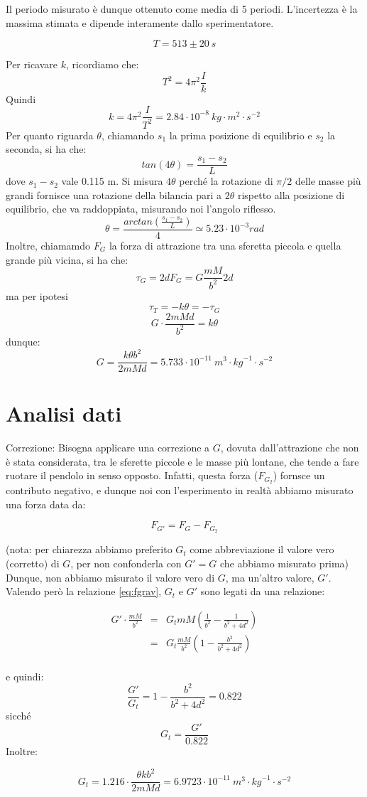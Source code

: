 Il periodo misurato è dunque ottenuto come media di 5 periodi. L'incertezza è la massima stimata e dipende interamente dallo sperimentatore.

$$T = 513 \pm 20 \ s$$

Per ricavare $k$, ricordiamo che:
$$T^2 = 4 \pi^2 \frac{I}{k}$$
Quindi
$$k = 4 \pi^2 \frac{I}{T^2} = 2.84 \cdot 10^{-8}\ kg\cdot m^2\cdot{s}^{-2}$$
Per quanto riguarda $\theta$, chiamando $s_1$ la prima posizione di equilibrio e $s_2$ la seconda, si ha che:
$$ tan(4\theta) = \frac{s_1-s_2}{L} $$
dove $s_1-s_2$ vale 0.115 m. Si misura $4\theta$ perché la rotazione di $\pi/2$ delle masse più grandi fornisce una rotazione della bilancia pari a $2\theta$ rispetto alla posizione di equilibrio, che va raddoppiata, misurando noi l'angolo riflesso.
$$ \theta = \frac{arctan(\frac{s_1-s_2}{L})}{4} \simeq 5.23 \cdot 10^{-3} rad $$
Inoltre, chiamamdo $F_G$ la forza di attrazione tra una sferetta piccola e quella grande più vicina, si ha che:
$$ \tau_G = 2dF_G = G\frac{mM}{b^2}2d $$
ma per ipotesi
$$ \tau_T = -k\theta = -\tau_G $$
$$ G\cdot\frac{2mMd}{b^2} = k\theta $$
dunque:
$$G = \frac{k \theta b^2}{2mMd} = 5.733 \cdot 10^{-11}\ {m}^3\cdot {kg}^{-1}\cdot{s}^{-2}$$

\section{Analisi dati} 

Correzione:
Bisogna applicare una correzione a $G$, dovuta dall'attrazione che non è stata considerata, tra le sferette piccole e le masse più lontane, che tende a fare ruotare il pendolo in senso opposto. Infatti, questa forza ($F_{G_2}$) fornsce un contributo negativo, e dunque noi con l'esperimento in realtà abbiamo misurato una forza data da:

\begin{equation}\label{eq:fgrav}
 F_{G'} = F_G - F_{G_2}
\end{equation}

(nota: per chiarezza abbiamo preferito $G_t$ come abbreviazione il valore vero (corretto) di $G$, per non confonderla con $G'=G$ che abbiamo misurato prima)
Dunque, non abbiamo misurato il valore vero di $G$, ma un'altro valore, $G'$. Valendo però la relazione \ref{eq:fgrav}, $G_t$ e $G'$ sono legati da una relazione:

\begin{eqnarray*}
G'\cdot\frac{mM}{b^2} & = & G_tmM(\frac{1}{b^2} - \frac{1}{b^2+4d^2}) \\
                      & = & G_t\frac{mM}{b^2}(1 - \frac{b^2}{b^2+4d^2}) \\
\end{eqnarray*}

e quindi:
$$ \frac{G'}{G_t} = 1-\frac{b^2}{b^2+4d^2} = 0.822$$
sicché
$$ G_t = \frac{G'}{0.822}$$
Inoltre:

$$ G_t = 1.216\cdot \frac{\theta k b^2}{2mMd} = 6.9723\cdot 10^{-11}\ {m}^3\cdot {kg}^{-1}\cdot{s}^{-2}$$
